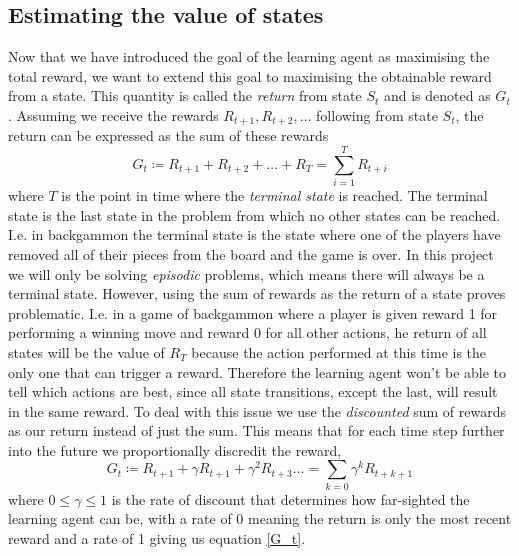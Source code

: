 \documentclass[11pt]{article}
\begin{document}
\maketitle


\subsection{Estimating the value of states}\label{est_vals}

Now that we have introduced the goal of the learning agent as
maximising the total reward, we want to extend this goal to
maximising the obtainable reward from a state.
This quantity is called the \textit{return} from state $S_t$ and is
denoted as $G_t$.
Assuming we receive the rewards $R_{t+1}, R_{t+2}, \dots$ following from state $S_t$,
the return can be expressed as the sum of these rewards
\begin{equation}\label{G_t}
    G_t \coloneqq R_{t+1} + R_{t+2} + \hdots + R_{T} = \sum\limits_{i = 1}^T R_{t+i}
\end{equation}
where $T$ is the point in time where the \textit{terminal state} is reached.
The terminal state is the last state in the problem from which
no other states can be reached.
I.e. in backgammon the terminal state is the state where one of the players
have removed all of their pieces from the board and the game is over.
In this project we will only be solving \textit{episodic} problems, which
means there will always be a terminal state.
However, using the sum of rewards as the return of a state proves problematic.
I.e. in a game of backgammon where a player is given reward 1 for performing a winning move
and reward 0 for all other actions, he return of all states will be
the value of $R_T$ because the action performed at this time is the only one
that can trigger a reward.
Therefore the learning agent won't be able to tell which actions are best,
since all state transitions, except the last, will result in the same reward.
To deal with this issue we use the \textit{discounted} sum of rewards as our return instead
of just the sum.
This means that for each time step further into the future
we proportionally discredit the reward,
\begin{equation}\label{gammaG_t}
    G_t \coloneqq R_{t+1} + \gamma R_{t+1} + \gamma^2 R_{t+3} \dots = \sum\limits_{k=0} \gamma^k R_{t+k+1}
\end{equation}
where $ 0 \leq \gamma \leq 1$ is the rate of discount that determines how far-sighted the learning agent can be,
with a rate of 0 meaning the return is only the most recent reward and a rate of 1 giving us equation \ref{G_t}.
\end{document}
